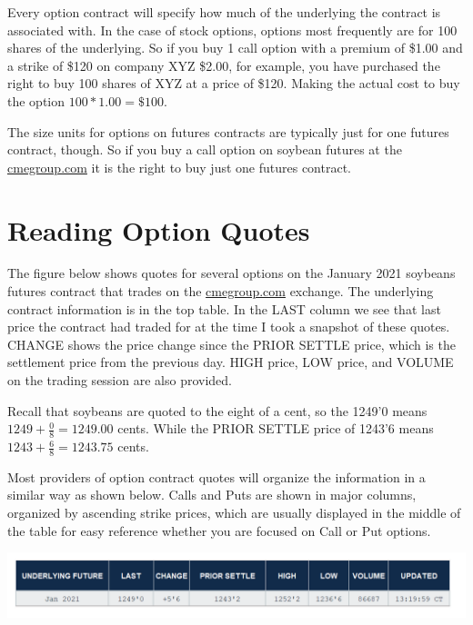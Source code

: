 \documentclass[
  letterpaper,
  DIV=11,
  numbers=noendperiod]{scrreprt}
\begin{document}
Every option contract will specify how much of the underlying the
contract is associated with. In the case of stock options, options most
frequently are for 100 shares of the underlying. So if you buy 1 call
option with a premium of \$1.00 and a strike of \$120 on company XYZ
\$2.00, for example, you have purchased the right to buy 100 shares of
XYZ at a price of \$120. Making the actual cost to buy the option
\(100*1.00 = \$100\).

The size units for options on futures contracts are typically just for
one futures contract, though. So if you buy a call option on soybean
futures at the \url{cmegroup.com} it is the right to buy just one
futures contract.

\hypertarget{reading-option-quotes}{%
\section{Reading Option Quotes}\label{reading-option-quotes}}

The figure below shows quotes for several options on the January 2021
soybeans futures contract that trades on the \url{cmegroup.com}
exchange. The underlying contract information is in the top table. In
the LAST column we see that last price the contract had traded for at
the time I took a snapshot of these quotes. CHANGE shows the price
change since the PRIOR SETTLE price, which is the settlement price from
the previous day. HIGH price, LOW price, and VOLUME on the trading
session are also provided.

Recall that soybeans are quoted to the eight of a cent, so the 1249'0
means \(1249 + \frac{0}{8} = 1249.00\) cents. While the PRIOR SETTLE
price of 1243'6 means \(1243 + \frac{6}{8} = 1243.75\) cents.

Most providers of option contract quotes will organize the information
in a similar way as shown below. Calls and Puts are shown in major
columns, organized by ascending strike prices, which are usually
displayed in the middle of the table for easy reference whether you are
focused on Call or Put options.

\includegraphics{assets/Options1-undelyingquote.PNG}
\end{document}
